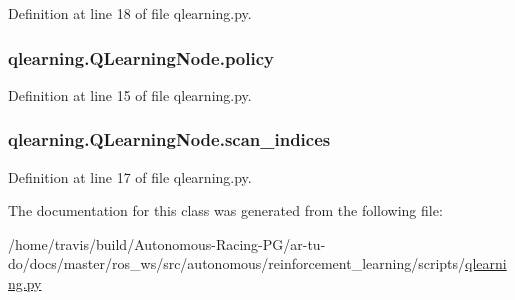 Definition at line 18 of file qlearning.\+py.

\subsubsection[{\texorpdfstring{policy}{policy}}]{\setlength{\rightskip}{0pt plus 5cm}qlearning.\+Q\+Learning\+Node.\+policy}\hypertarget{classqlearning_1_1_q_learning_node_a2c1150dd506209b085dad03036775375}{}\label{classqlearning_1_1_q_learning_node_a2c1150dd506209b085dad03036775375}


Definition at line 15 of file qlearning.\+py.

\subsubsection[{\texorpdfstring{scan\+\_\+indices}{scan_indices}}]{\setlength{\rightskip}{0pt plus 5cm}qlearning.\+Q\+Learning\+Node.\+scan\+\_\+indices}\hypertarget{classqlearning_1_1_q_learning_node_a40b085aff23685cc49b297f287743ed6}{}\label{classqlearning_1_1_q_learning_node_a40b085aff23685cc49b297f287743ed6}


Definition at line 17 of file qlearning.\+py.



The documentation for this class was generated from the following file\+:\begin{DoxyCompactItemize}
\item 
/home/travis/build/\+Autonomous-\/\+Racing-\/\+P\+G/ar-\/tu-\/do/docs/master/ros\+\_\+ws/src/autonomous/reinforcement\+\_\+learning/scripts/\hyperlink{qlearning_8py}{qlearning.\+py}\end{DoxyCompactItemize}
